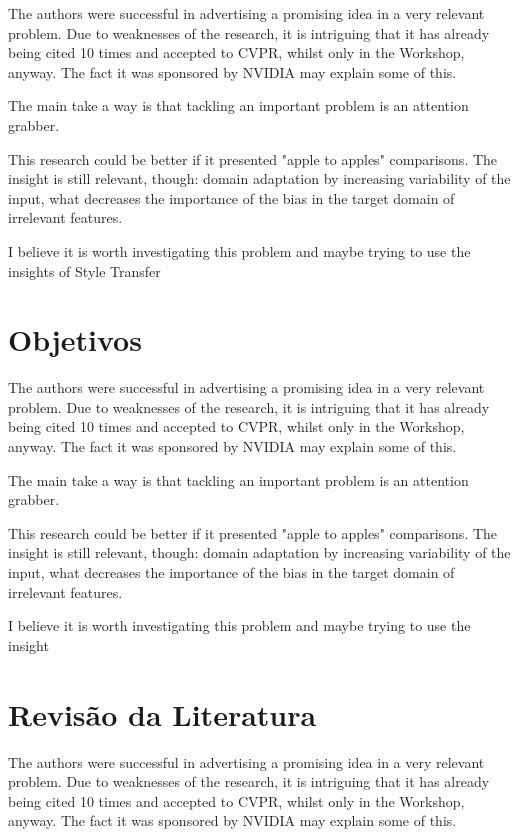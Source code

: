 \documentclass[
12pt, %
a4paper, %
onecolumn, %
]{article}
\begin{document}
The authors were successful in advertising a promising idea in a very relevant problem.  Due to weaknesses of the research, it is intriguing that it has already being cited 10 times and accepted to CVPR, whilst only in the Workshop, anyway. The fact it was sponsored by NVIDIA may explain some of this.

The main take a way is that tackling an important problem is an attention grabber. 

This research could be better if it presented "apple to apples" comparisons. The insight is still relevant, though: domain adaptation by increasing variability of the input, what decreases the importance of the bias in the target domain of irrelevant features.

I believe it is worth investigating this problem and maybe trying to use the insights of Style Transfer


\section{Objetivos}

The authors were successful in advertising a promising idea in a very relevant problem.  Due to weaknesses of the research, it is intriguing that it has already being cited 10 times and accepted to CVPR, whilst only in the Workshop, anyway. The fact it was sponsored by NVIDIA may explain some of this.

The main take a way is that tackling an important problem is an attention grabber. 

This research could be better if it presented "apple to apples" comparisons. The insight is still relevant, though: domain adaptation by increasing variability of the input, what decreases the importance of the bias in the target domain of irrelevant features.

I believe it is worth investigating this problem and maybe trying to use the insight


\section{Revisão da Literatura}

The authors were successful in advertising a promising idea in a very relevant problem.  Due to weaknesses of the research, it is intriguing that it has already being cited 10 times and accepted to CVPR, whilst only in the Workshop, anyway. The fact it was sponsored by NVIDIA may explain some of this.
\end{document}
